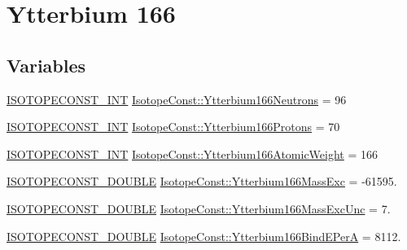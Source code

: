 \hypertarget{group___isotope_const-_ytterbium-_yb166}{}\section{Ytterbium 166}
\label{group___isotope_const-_ytterbium-_yb166}
\subsection*{Variables}
\begin{DoxyCompactItemize}
\item 
\mbox{\hyperlink{group___isotope_const-_macros_ga5f18360b3e99483a35c32d789e62621c}{I\+S\+O\+T\+O\+P\+E\+C\+O\+N\+S\+T\+\_\+\+I\+NT}} \mbox{\hyperlink{group___isotope_const-_ytterbium-_yb166_gabdab157f54085615b089a714bcaa190e}{Isotope\+Const\+::\+Ytterbium166\+Neutrons}} = 96
\item 
\mbox{\hyperlink{group___isotope_const-_macros_ga5f18360b3e99483a35c32d789e62621c}{I\+S\+O\+T\+O\+P\+E\+C\+O\+N\+S\+T\+\_\+\+I\+NT}} \mbox{\hyperlink{group___isotope_const-_ytterbium-_yb166_gaefc5dea41be5e408e5cd5e2c31dba765}{Isotope\+Const\+::\+Ytterbium166\+Protons}} = 70
\item 
\mbox{\hyperlink{group___isotope_const-_macros_ga5f18360b3e99483a35c32d789e62621c}{I\+S\+O\+T\+O\+P\+E\+C\+O\+N\+S\+T\+\_\+\+I\+NT}} \mbox{\hyperlink{group___isotope_const-_ytterbium-_yb166_gabec2b76d2718c7a7ac7460fa065054ed}{Isotope\+Const\+::\+Ytterbium166\+Atomic\+Weight}} = 166
\item 
\mbox{\hyperlink{group___isotope_const-_macros_ga8f45a7272ce02c0b4c65c44636ed719a}{I\+S\+O\+T\+O\+P\+E\+C\+O\+N\+S\+T\+\_\+\+D\+O\+U\+B\+LE}} \mbox{\hyperlink{group___isotope_const-_ytterbium-_yb166_ga886507007aa0d17ef6f6a0cb54524b4d}{Isotope\+Const\+::\+Ytterbium166\+Mass\+Exc}} = -\/61595.
\item 
\mbox{\hyperlink{group___isotope_const-_macros_ga8f45a7272ce02c0b4c65c44636ed719a}{I\+S\+O\+T\+O\+P\+E\+C\+O\+N\+S\+T\+\_\+\+D\+O\+U\+B\+LE}} \mbox{\hyperlink{group___isotope_const-_ytterbium-_yb166_ga8b8cdf7b0499750fa48d999e1d45a281}{Isotope\+Const\+::\+Ytterbium166\+Mass\+Exc\+Unc}} = 7.
\item 
\mbox{\hyperlink{group___isotope_const-_macros_ga8f45a7272ce02c0b4c65c44636ed719a}{I\+S\+O\+T\+O\+P\+E\+C\+O\+N\+S\+T\+\_\+\+D\+O\+U\+B\+LE}} \mbox{\hyperlink{group___isotope_const-_ytterbium-_yb166_ga4c6aac47cd1991acbf63332142165d43}{Isotope\+Const\+::\+Ytterbium166\+Bind\+E\+PerA}} = 8112.
\item 

\end{DoxyCompactItemize}

